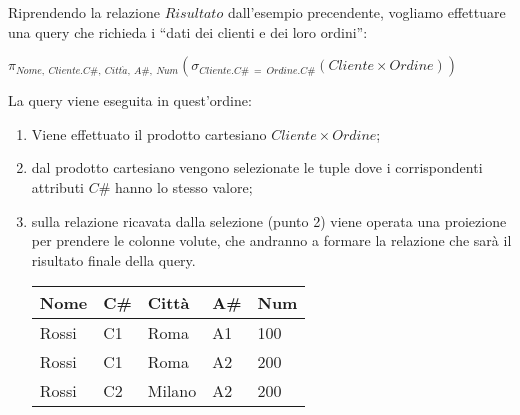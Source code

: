 \begin{exmp}
 Riprendendo la relazione $Risultato$ dall'esempio precendente, vogliamo effettuare
 una query che richieda i ``dati dei clienti e dei loro ordini'':
 \begin{center}
  \begin{math}
   \pi_{Nome,\ Cliente.C\#,\ Citt\grave{a},\ A\#,\ Num} 
   (\sigma_{Cliente.C\#\ =\ Ordine.C\#}(
   Cliente \times Ordine))
  \end{math}
 \end{center}
 La query viene eseguita in quest'ordine:
 \begin{enumerate}
  \item Viene effettuato il prodotto cartesiano $Cliente \times Ordine$;
  \item dal prodotto cartesiano vengono selezionate le tuple dove i corrispondenti
  attributi $C\#$ hanno lo stesso valore;
  \item sulla relazione ricavata dalla selezione (punto 2) viene operata una proiezione
  per prendere le colonne volute, che andranno a formare la relazione che
  sarà il risultato finale della query.
\begin{center}
 \begin{tabular}{l|l|l|l|l}
  Nome & C\# & Città  & A\# & Num\\
  \hline
  Rossi & C1 & Roma  & A1 & 100\\
  Rossi & C1 & Roma  & A2 & 200\\
  Rossi & C2 & Milano & A2 & 200\\
 \end{tabular}

\end{center}
 \end{enumerate}

\end{exmp}

